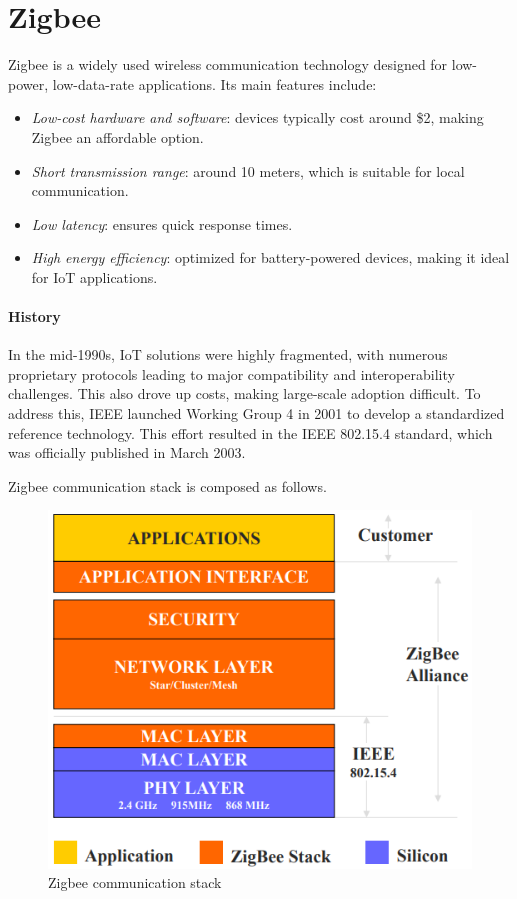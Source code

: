 \section{Zigbee}

Zigbee is a widely used wireless communication technology designed for low-power, low-data-rate applications. 
Its main features include:
\begin{itemize}
    \item \textit{Low-cost hardware and software}: devices typically cost around \$2, making Zigbee an affordable option.
    \item \textit{Short transmission range}: around 10 meters, which is suitable for local communication.
    \item \textit{Low latency}: ensures quick response times.
    \item \textit{High energy efficiency}: optimized for battery-powered devices, making it ideal for IoT applications.
\end{itemize}

\paragraph*{History}
In the mid-1990s, IoT solutions were highly fragmented, with numerous proprietary protocols leading to major compatibility and interoperability challenges. 
This also drove up costs, making large-scale adoption difficult.
To address this, IEEE launched Working Group 4 in 2001 to develop a standardized reference technology. 
This effort resulted in the IEEE 802.15.4 standard, which was officially published in March 2003.

Zigbee communication stack is composed as follows.
\begin{figure}[H]
    \centering
    \includegraphics[width=0.5\linewidth]{images/zig.png}
    \caption{Zigbee communication stack}
\end{figure}

